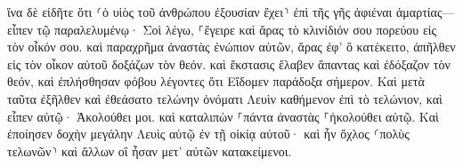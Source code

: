 \documentclass{openreader}
\begin{document}
ἵνα δὲ εἰδῆτε ὅτι ⸂ὁ υἱὸς τοῦ ἀνθρώπου ἐξουσίαν ἔχει⸃ ἐπὶ τῆς γῆς ἀφιέναι ἁμαρτίας— εἶπεν τῷ παραλελυμένῳ· Σοὶ λέγω, ⸀ἔγειρε καὶ ἄρας τὸ κλινίδιόν σου πορεύου εἰς τὸν οἶκόν σου. 
καὶ παραχρῆμα ἀναστὰς ἐνώπιον αὐτῶν, ἄρας ἐφ’ ὃ κατέκειτο, ἀπῆλθεν εἰς τὸν οἶκον αὐτοῦ δοξάζων τὸν θεόν. 
καὶ ἔκστασις ἔλαβεν ἅπαντας καὶ ἐδόξαζον τὸν θεόν, καὶ ἐπλήσθησαν φόβου λέγοντες ὅτι Εἴδομεν παράδοξα σήμερον. 
Καὶ μετὰ ταῦτα ἐξῆλθεν καὶ ἐθεάσατο τελώνην ὀνόματι Λευὶν καθήμενον ἐπὶ τὸ τελώνιον, καὶ εἶπεν αὐτῷ· Ἀκολούθει μοι. 
καὶ καταλιπὼν ⸀πάντα ἀναστὰς ⸀ἠκολούθει αὐτῷ. 
Καὶ ἐποίησεν δοχὴν μεγάλην Λευὶς αὐτῷ ἐν τῇ οἰκίᾳ αὐτοῦ· καὶ ἦν ὄχλος ⸂πολὺς τελωνῶν⸃ καὶ ἄλλων οἳ ἦσαν μετ’ αὐτῶν κατακείμενοι. 
\end{document}
